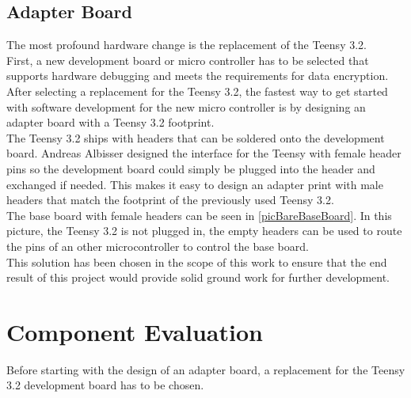 \subsection{Adapter Board}
The most profound hardware change is the replacement of the Teensy 3.2.\\
First, a new development board or micro controller has to be selected that supports hardware debugging and meets the requirements for data encryption. \\
After selecting a replacement for the Teensy 3.2, the fastest way to get started with software development for the new micro controller is by designing an adapter board with a Teensy 3.2 footprint. \\
The Teensy 3.2 ships with headers that can be soldered onto the development board. Andreas Albisser designed the interface for the Teensy with female header pins so the development board could simply be plugged into the header and exchanged if needed. This makes it easy to design an adapter print with male headers that match the footprint of the previously used Teensy 3.2. \\
The base board with female headers can be seen in \autoref{picBareBaseBoard}. In this picture, the Teensy 3.2 is not plugged in, the empty headers can be used to route the pins of an other microcontroller to control the base board.\\
This solution has been chosen in the scope of this work to ensure that the end result of this project would provide solid ground work for further development.
%
%
%
\section{Component Evaluation}
Before starting with the design of an adapter board, a replacement for the Teensy 3.2 development board has to be chosen. \\
%
